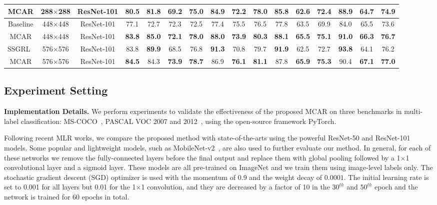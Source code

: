 \documentclass[journal]{IEEEtran}
\begin{document}
\begin{table*}[t]
{\begin{tabular}{|c|c|c||c||c|c|c|c|c|c||c|c|c|c|c|c|}
\hline\hline
MCAR &288$\times$288 &ResNet-101    &80.5 &81.8 &69.2 &75.0 &84.9 &72.2 &78.0  &85.8 &62.6 &72.4 &88.9 &64.7 &74.9 \\
\hline\hline
Baseline &448$\times$448&ResNet-101  &77.1 &72.7 &72.3 &72.5 &77.4 &75.5 &76.5  &77.8 &63.5 &69.9 &84.0 &65.5 &73.6\\
MCAR &448$\times$448&ResNet-101  &\textbf{83.8} &\textbf{85.0} &\textbf{72.1} &\textbf{78.0} &\textbf{88.0} &\textbf{73.9} &\textbf{80.3} &\textbf{88.1} &\textbf{65.5} &\textbf{75.1} &\textbf{91.0} &\textbf{66.3} &\textbf{76.7}\\
\hline\hline
SSGRL~\cite{chenlearning}        & 576$\times$576           &ResNet-101  &83.8 &\textbf{89.9} &68.5 &76.8 &\textbf{91.3} &70.8 &79.7 &\textbf{91.9} &62.5 &72.7 &\textbf{93.8} &64.1 &76.2 \\
MCAR &576$\times$576 &ResNet-101 &\textbf{84.5}  &84.3 &\textbf{73.9} &\textbf{78.7} &86.9 &\textbf{76.1} &\textbf{81.1} &87.8 &\textbf{65.9} &\textbf{75.3} &90.4 &\textbf{67.1} &\textbf{77.0}\\
\hline
\end{tabular}}
\end{table*}

\subsection{Experiment Setting}
\noindent \textbf{Implementation Details.}
We perform experiments to validate the effectiveness of the proposed MCAR on three benchmarks in multi-label classification: MS-COCO~\cite{lin2014microsoft}, PASCAL VOC 2007 and 2012~\cite{everingham2010pascal}, using the open-source framework PyTorch. 

Following recent MLR works, we compare the proposed method with state-of-the-arts using the powerful ResNet-50 and ResNet-101~\cite{he2016deep} models. Some popular and lightweight models, such as MobileNet-v2~\cite{sandlermobilenetv2}, are also used to further evaluate our method. In general, for each of these networks we remove the fully-connected layers before the final output and replace them with global pooling followed by a 1$\times$1 convolutional layer and a sigmoid layer. These models are all pre-trained on ImageNet and we train them using image-level labels only. The stochastic gradient descent (SGD) optimizer is used with the momentum of 0.9 and the weight decay of $0.0001$. The initial learning rate is set to 0.001 for all layers but 0.01 for the 1$\times$1 convolution, and they are decreased by a factor of 10 in the $30^{th}$ and $50^{th}$ epoch and the network is trained for 60 epochs in total.
\end{document}
